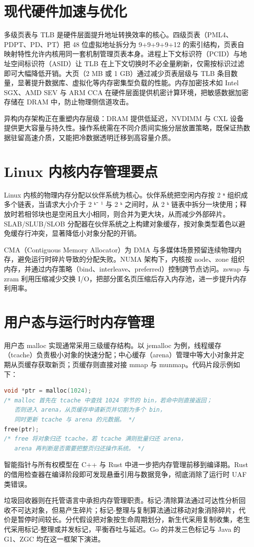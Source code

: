 \chapter{现代硬件加速与优化}
多级页表与 TLB 是硬件层面提升地址转换效率的核心。四级页表（PML4、PDPT、PD、PT）把 48 位虚拟地址拆分为 9+9+9+9+12 的索引结构，页表自映射特性允许内核用同一套机制管理页表本身。进程上下文标识符（PCID）与地址空间标识符（ASID）让 TLB 在上下文切换时不必全量刷新，仅需按标识过滤即可大幅降低开销。大页（2 MB 或 1 GB）通过减少页表层级与 TLB 条目数量，显著提升数据库、虚拟化等内存密集型负载的性能。内存加密技术如 Intel SGX、AMD SEV 与 ARM CCA 在硬件层面提供机密计算环境，把敏感数据加密存储在 DRAM 中，防止物理侧信道攻击。\par
异构内存架构正在重塑内存层级：DRAM 提供低延迟，NVDIMM 与 CXL 设备提供更大容量与持久性。操作系统需在不同介质间实施分层放置策略，既保证热数据驻留高速介质，又能把冷数据透明迁移到高容量介质。\par
\chapter{Linux 内核内存管理要点}
Linux 内核的物理内存分配以伙伴系统为核心。伙伴系统把空闲内存按 2 ⁿ 组织成多个链表，当请求大小介于 2 ᵏ⁻ ¹ 与 2 ᵏ 之间时，从 2 ᵏ 链表中拆分一块使用；释放时若相邻块也是空闲且大小相同，则合并为更大块，从而减少外部碎片。SLAB/SLUB/SLOB 分配器在伙伴系统之上构建对象缓存，按对象类型着色以避免缓存行冲突，显著降低小对象分配的开销。\par
CMA（Contiguous Memory Allocator）为 DMA 与多媒体场景预留连续物理内存，避免运行时碎片导致的分配失败。NUMA 架构下，内核按 node、zone 组织内存，并通过内存策略（bind、interleave、preferred）控制跨节点访问。zswap 与 zram 利用压缩减少交换 I/O，把部分匿名页压缩后存入内存池，进一步提升内存利用率。\par
\chapter{用户态与运行时内存管理}
用户态 malloc 实现通常采用三级缓存结构。以 jemalloc 为例，线程缓存（tcache）负责极小对象的快速分配；中心缓存（arena）管理中等大小对象并定期从页缓存获取新页；页缓存则直接对接 mmap 与 munmap。代码片段示例如下：\par
\begin{lstlisting}[language=c]
void *ptr = malloc(1024);
/* malloc 首先在 tcache 中查找 1024 字节的 bin，若命中则直接返回；
   否则进入 arena，从页缓存申请新页并切割为多个 bin，
   同时更新 tcache 与 arena 的元数据。 */
free(ptr);
/* free 将对象归还 tcache，若 tcache 满则批量归还 arena，
   arena 再判断是否需要把整页归还操作系统。 */
\end{lstlisting}
智能指针与所有权模型在 C++ 与 Rust 中进一步把内存管理前移到编译期。Rust 的借用检查器在编译阶段即可发现悬垂引用与数据竞争，彻底消除了运行时 UAF 类错误。\par
垃圾回收器则在托管语言中承担内存管理职责。标记-清除算法通过可达性分析回收不可达对象，但易产生碎片；标记-整理与复制算法通过移动对象消除碎片，代价是暂停时间较长。分代假设把对象按生命周期划分，新生代采用复制收集，老生代采用标记-整理或并发标记，平衡吞吐与延迟。Go 的并发三色标记与 Java 的 G1、ZGC 均在这一框架下演进。\par
